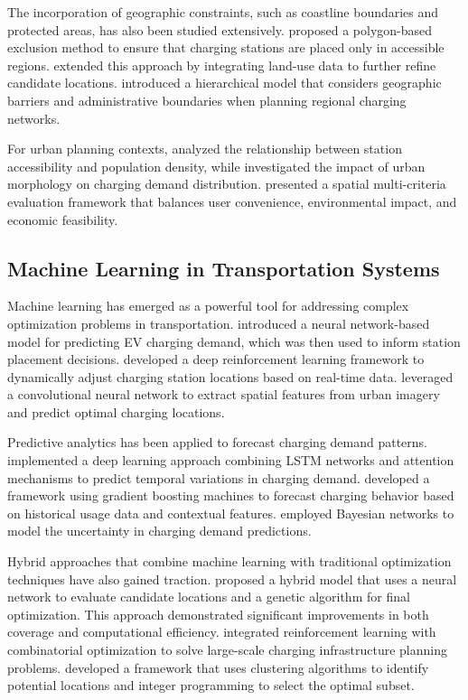 \documentclass[journal]{IEEEtran}
\begin{document}
The incorporation of geographic constraints, such as coastline boundaries and protected areas, has also been studied extensively. \cite{xu2018coastal} proposed a polygon-based exclusion method to ensure that charging stations are placed only in accessible regions. \cite{gao2021land} extended this approach by integrating land-use data to further refine candidate locations. \cite{zhao2019hierarchical} introduced a hierarchical model that considers geographic barriers and administrative boundaries when planning regional charging networks.

For urban planning contexts, \cite{frade2011optimal} analyzed the relationship between station accessibility and population density, while \cite{andrenacci2016demand} investigated the impact of urban morphology on charging demand distribution. \cite{shahraki2015optimal} presented a spatial multi-criteria evaluation framework that balances user convenience, environmental impact, and economic feasibility.

\subsection{Machine Learning in Transportation Systems}
Machine learning has emerged as a powerful tool for addressing complex optimization problems in transportation. \cite{huang2019neural} introduced a neural network-based model for predicting EV charging demand, which was then used to inform station placement decisions. \cite{liu2020deep} developed a deep reinforcement learning framework to dynamically adjust charging station locations based on real-time data. \cite{zhu2018data} leveraged a convolutional neural network to extract spatial features from urban imagery and predict optimal charging locations.

Predictive analytics has been applied to forecast charging demand patterns. \cite{wei2018deep} implemented a deep learning approach combining LSTM networks and attention mechanisms to predict temporal variations in charging demand. \cite{yuan2019data} developed a framework using gradient boosting machines to forecast charging behavior based on historical usage data and contextual features. \cite{xiang2019data} employed Bayesian networks to model the uncertainty in charging demand predictions.

Hybrid approaches that combine machine learning with traditional optimization techniques have also gained traction. \cite{sun2021hybrid} proposed a hybrid model that uses a neural network to evaluate candidate locations and a genetic algorithm for final optimization. This approach demonstrated significant improvements in both coverage and computational efficiency. \cite{cao2021reinforcement} integrated reinforcement learning with combinatorial optimization to solve large-scale charging infrastructure planning problems. \cite{arias2016data} developed a framework that uses clustering algorithms to identify potential locations and integer programming to select the optimal subset.
\end{document}
